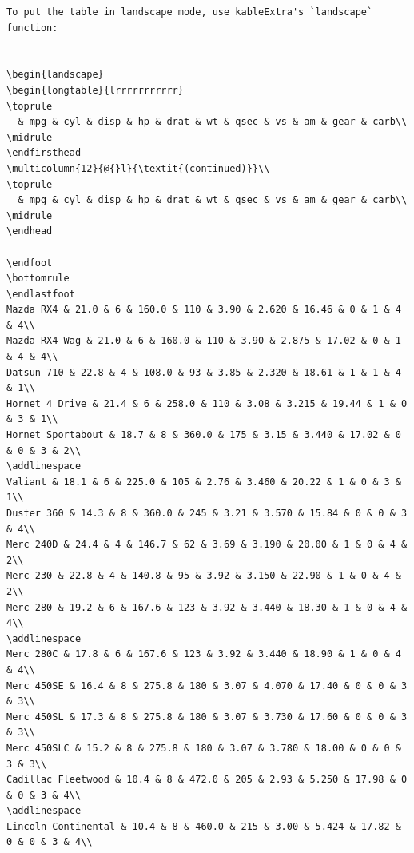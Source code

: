 \documentclass[a4paper, nobind]{templates/ociamthesis}
\begin{document}
\begin{verbatim}
To put the table in landscape mode, use kableExtra's `landscape` function:


\begin{landscape}
\begin{longtable}{lrrrrrrrrrrr}
\toprule
  & mpg & cyl & disp & hp & drat & wt & qsec & vs & am & gear & carb\\
\midrule
\endfirsthead
\multicolumn{12}{@{}l}{\textit{(continued)}}\\
\toprule
  & mpg & cyl & disp & hp & drat & wt & qsec & vs & am & gear & carb\\
\midrule
\endhead

\endfoot
\bottomrule
\endlastfoot
Mazda RX4 & 21.0 & 6 & 160.0 & 110 & 3.90 & 2.620 & 16.46 & 0 & 1 & 4 & 4\\
Mazda RX4 Wag & 21.0 & 6 & 160.0 & 110 & 3.90 & 2.875 & 17.02 & 0 & 1 & 4 & 4\\
Datsun 710 & 22.8 & 4 & 108.0 & 93 & 3.85 & 2.320 & 18.61 & 1 & 1 & 4 & 1\\
Hornet 4 Drive & 21.4 & 6 & 258.0 & 110 & 3.08 & 3.215 & 19.44 & 1 & 0 & 3 & 1\\
Hornet Sportabout & 18.7 & 8 & 360.0 & 175 & 3.15 & 3.440 & 17.02 & 0 & 0 & 3 & 2\\
\addlinespace
Valiant & 18.1 & 6 & 225.0 & 105 & 2.76 & 3.460 & 20.22 & 1 & 0 & 3 & 1\\
Duster 360 & 14.3 & 8 & 360.0 & 245 & 3.21 & 3.570 & 15.84 & 0 & 0 & 3 & 4\\
Merc 240D & 24.4 & 4 & 146.7 & 62 & 3.69 & 3.190 & 20.00 & 1 & 0 & 4 & 2\\
Merc 230 & 22.8 & 4 & 140.8 & 95 & 3.92 & 3.150 & 22.90 & 1 & 0 & 4 & 2\\
Merc 280 & 19.2 & 6 & 167.6 & 123 & 3.92 & 3.440 & 18.30 & 1 & 0 & 4 & 4\\
\addlinespace
Merc 280C & 17.8 & 6 & 167.6 & 123 & 3.92 & 3.440 & 18.90 & 1 & 0 & 4 & 4\\
Merc 450SE & 16.4 & 8 & 275.8 & 180 & 3.07 & 4.070 & 17.40 & 0 & 0 & 3 & 3\\
Merc 450SL & 17.3 & 8 & 275.8 & 180 & 3.07 & 3.730 & 17.60 & 0 & 0 & 3 & 3\\
Merc 450SLC & 15.2 & 8 & 275.8 & 180 & 3.07 & 3.780 & 18.00 & 0 & 0 & 3 & 3\\
Cadillac Fleetwood & 10.4 & 8 & 472.0 & 205 & 2.93 & 5.250 & 17.98 & 0 & 0 & 3 & 4\\
\addlinespace
Lincoln Continental & 10.4 & 8 & 460.0 & 215 & 3.00 & 5.424 & 17.82 & 0 & 0 & 3 & 4\\

\end{verbatim}
\end{document}
